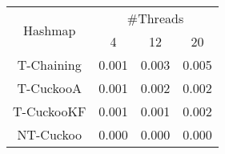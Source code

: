 \begin{tabular}{|c|c|c|c|}
\hline
\multirow{2}{*}{Hashmap} & \multicolumn{3}{c|}{\#Threads}\\\cline{2-4}& 4 & 12 & 20\\
\hline
\hline
T-Chaining & 0.001 & 0.003 & 0.005\\
T-CuckooA & 0.001 & 0.002 & 0.002\\
T-CuckooKF & 0.001 & 0.001 & 0.002\\
NT-Cuckoo & 0.000 & 0.000 & 0.000\\
\hline
\end{tabular}
